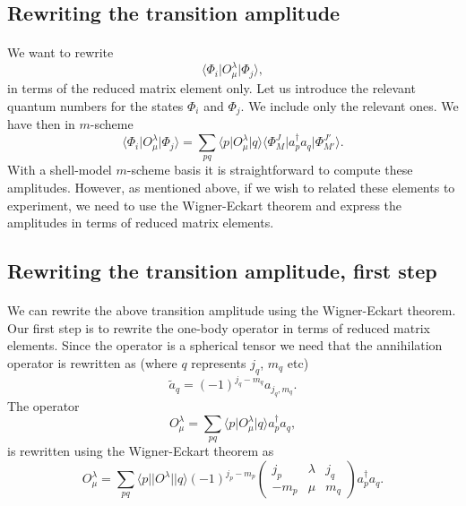 \documentclass[%
oneside,                 %
final,                   %
10pt]{article}
\begin{document}
\subsection{Rewriting the transition amplitude}

\paragraph{}
We want to rewrite 
\[
\langle \Phi_i \vert O_{\mu}^{\lambda} \vert \Phi_j\rangle, 
\]
in terms of the reduced matrix element only. 
Let us introduce the relevant quantum numbers for the states $\Phi_i$ and $\Phi_j$. We include only the relevant ones. We have then in $m$-scheme
\[
\langle \Phi_i \vert O_{\mu}^{\lambda} \vert \Phi_j\rangle = \sum_{pq} \langle p \vert O_{\mu}^{\lambda} \vert q \rangle \langle \Phi_{M}^{J} \vert a^{\dagger}_pa_q \vert \Phi_{M'}^{J'}\rangle.
\]
With a shell-model $m$-scheme basis it is straightforward to compute these amplitudes. 
However, as mentioned above, if we wish to related these elements to experiment, we need to use the Wigner-Eckart theorem and express the amplitudes in terms of reduced matrix elements.



\subsection{Rewriting the transition amplitude, first step}

\paragraph{}
We can rewrite the above transition amplitude using the Wigner-Eckart theorem. Our first step
is to rewrite the one-body operator in terms of reduced matrix elements. Since the operator is a spherical tensor we need that the annihilation operator is rewritten as (where $q$ represents $j_q$, $m_q$ etc)
\[
\tilde{a}_q=\left(-1\right)^{j_q-m_q}a_{j_q,m_q}.
\]
The operator 
\[
O_{\mu}^{\lambda} = \sum_{pq} \langle p \vert O_{\mu}^{\lambda} \vert q \rangle a^{\dagger}_pa_q,
\]
is rewritten using the Wigner-Eckart theorem as 
\[
O_{\mu}^{\lambda} = \sum_{pq} \langle p \vert \vert O^{\lambda}\vert \vert q \rangle (-1)^{j_p-m_p}\left(\begin{array}{ccc}  j_p & \lambda & j_q \\ -m_p & \mu & m_q\end{array}\right)a^{\dagger}_pa_q.
\]
\end{document}

